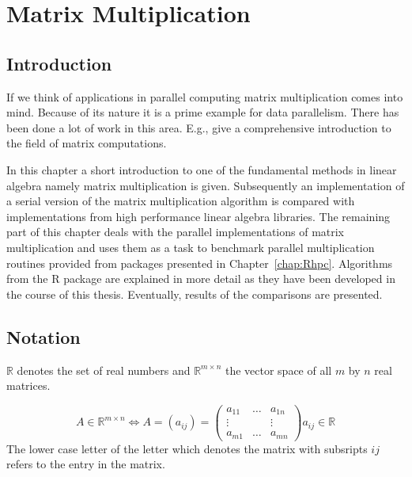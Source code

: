 

\newcommand{\NROW}{\textbf{nrow}}
\newcommand{\NCOL}{\textbf{ncol}}
\newcommand{\OMPFOR}{\textbf{!\$omp parallel for }}
\newcommand{\OMPPRIV}{\textbf{private}}
\newcommand{\OMPSHARE}{\textbf{shared}}
\newcommand{\SERIALMM}{\textbf{serial.mult}}
\newcommand{\MAX}{\textbf{max}}
\chapter{Matrix Multiplication}
\label{chap:matrix}
\section{Introduction}

If we think of applications in parallel computing matrix
multiplication comes into mind. Because of its nature it is a prime
example for data parallelism. There has been done a lot of work in
this area. E.g., \cite{golub96mc} give a comprehensive introduction to the
field of matrix computations. 


In this chapter a short introduction to one of the fundamental methods
in linear algebra namely matrix multiplication is
given. Subsequently an implementation of a serial version of the matrix
multiplication algorithm is compared with implementations from high
performance linear algebra libraries. The remaining part of this
chapter deals with the parallel implementations of matrix
multiplication and uses them as a task to benchmark parallel
multiplication routines provided from packages presented in
Chapter~\ref{chap:Rhpc}. Algorithms from the R package  are
explained in more detail as they have been developed in the course of
this thesis. Eventually, results of the comparisons are presented.

\section{Notation}

$ \mathbb{R} $ denotes the set of real numbers and $ \mathbb{R}^{m
  \times n} $ the vector space of all $m$ by $n$ real matrices.

$$ A \in \mathbb{R}^{m \times n} \Longleftrightarrow A = (a_{ij}) = 
\left( \begin{array}{ccc}
a_{11} & \ldots & a_{1n} \\
\vdots &        & \vdots \\
a_{m1} & \ldots & a_{mn}
\end{array} \right)
a_{ij} \in \mathbb{R}
 $$
The lower case letter of the letter which denotes the matrix with
subsripts $ij$ refers to the entry in the matrix. 

